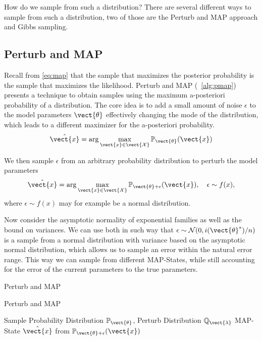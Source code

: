 How do we sample from such a distribution? There are several different ways to sample from such a distribution, two of those are the Perturb and MAP approach and Gibbs sampling.


\subsection{Perturb and MAP}
\label{ssec:pmap}
Recall from \eq\ref{eq:map} that the sample that maximizes the posterior probability is the sample that maximizes the likelihood.
Perturb and MAP (\alg~\ref{alg:pmap}) presents a technique to obtain samples using the maximum a-posteriori probability of a distribution.
The core idea is to add a small amount of noise $\epsilon$ to the model parameters $\vect{\theta}$ effectively changing the mode of the distribution, which leads to a different maximizer for the a-posteriori probability. 
\begin{equation}
    \hat{\vect{x}}  = \arg\max_{\vect{x} \in \vect{\mathcal{X}}} \mathbb{P}_{\vect{\theta}}(\vect{x})
\end{equation}

We then sample $\epsilon$ from an arbitrary probability distribution to perturb the model parameters
\begin{equation}
    \hat{\vect{x}}  = \arg\max_{\vect{x} \in \vect{\mathcal{X}}} \mathbb{P}_{\vect{\theta} + \epsilon}(\vect{x}), \quad \epsilon \sim f(x),
\end{equation}
where $\epsilon \sim f(x)$ may for example be a normal distribution.

Now consider the asymptotic normality of exponential families as well as the bound on variances. 
We can use both in such way that $\epsilon\sim \mathcal{N}(0, i(\vect{\theta}^*)/n)$ is a sample from a normal distribution with variance based on the asymptotic normal distribution, which allows us to sample an error within the natural error range.
This way we can sample from different MAP-States, while still accounting for the error of the current parameters \wrt to the true parameters.


\begin{algo}{Perturb and MAP~\cite{papandreou2011perturb}}
    \begin{algorithm}[H]
        \caption{Perturb and MAP}
        \begin{algorithmic}[1]
            \label{alg:pmap}
            \REQUIRE Sample Probability Distribution $\mathbb{P}_{\vect{\theta}}$, Perturb Distribution $\mathbb{Q}_{\vect{\lambda}}$
            \ENSURE  MAP-State $\hat{\vect{x}}$ from $\mathbb{P}_{\vect{\theta} + \epsilon}(\vect{x})$ \\
            \\
            \\
        \end{algorithmic}
    \end{algorithm}
\end{algo}

